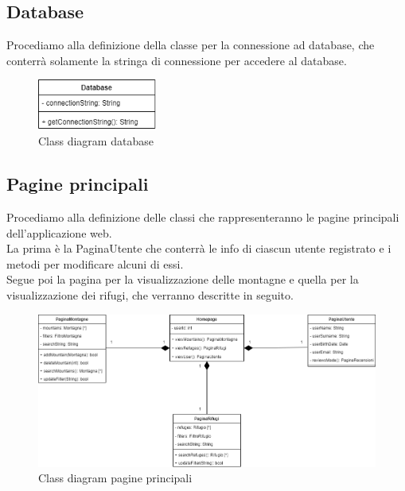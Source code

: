 \documentclass[a4paper,12pt]{article}
\begin{document}
\subsection{Database}
Procediamo alla definizione della classe per la connessione ad database, che conterrà solamente la stringa di connessione per accedere al database.
\begin{figure}[H]
   \centering
   \includegraphics[width=0.35\textwidth] {D3/img/class_diagram_database.png}
    \caption{Class diagram database}
\end{figure}

\subsection{Pagine principali}
Procediamo alla definizione delle classi che rappresenteranno le pagine principali dell'applicazione web. \\
La prima è la PaginaUtente che conterrà le info di ciascun utente registrato e i metodi per modificare alcuni di essi.\\
Segue poi la pagina per la visualizzazione delle montagne e quella per la visualizzazione dei rifugi, che verranno descritte in seguito.

\begin{figure}[H]
   \centering
   \includegraphics[width=1\textwidth] {D3/img/class_diagram_homepage.png}
    \caption{Class diagram pagine principali}
\end{figure}
\end{document}
